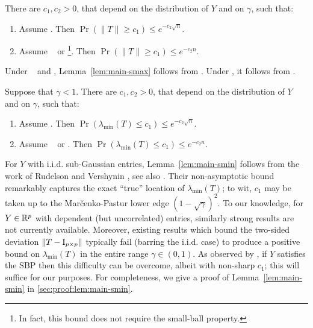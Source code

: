 \documentclass[times,sort&compress,3p]{elsarticle}
\begin{document}
\begin{lemma}\label{lem:main-smax}
    There are $c_1,c_2>0$, that depend on the distribution of $Y$ and on $\gamma$, such that:
    \begin{enumerate}
    \item Assume \AssumLC. Then $\Pr\left( \|T\| \ge c_1 \right) \le e^{-c_2 \sqrt{n}}$.
    \item Assume \AssumIndep~ or \AssumCCPSB \footnote{In fact, this bound does not require the small-ball property.}. Then $\Pr\left( \|T\| \ge c_1 \right) \le e^{-c_2 n}$.
    \end{enumerate}
\end{lemma}
Under \AssumIndep~ and \AssumCCPSB, Lemma~\ref{lem:main-smax} follows from \cite[Theorem 5.39]{Vershynin}. Under \AssumLC, it follows from \cite[Theorem 1]{adamczak2011sharp}. 

\begin{lemma}\label{lem:main-smin}
    Suppose that $\gamma < 1$. There are $c_1,c_2>0$, that depend on the distribution of $Y$ and on $\gamma$, such that:
    \begin{enumerate}
        \item Assume \AssumLC. Then $\Pr\left( \lambda_{\min}(T) \le c_1 \right) \le e^{-c_2 \sqrt{n}}$.
        \item Assume \AssumIndep~ or \AssumCCPSB. Then $\Pr\left( \lambda_{\min}(T) \le c_1 \right) \le e^{-c_2 n}$.
    \end{enumerate}
\end{lemma}
For $Y$ with i.i.d. sub-Gaussian entries, Lemma~\ref{lem:main-smin} follows from the work of Rudelson and Vershynin \cite{rudelson2009smallest}, see also 
\cite[Theorem 5.38]{Vershynin}. Their non-asymptotic bound remarkably captures the exact ``true'' location of $\lambda_{\min}(T)$; to wit, $c_1$ may be taken up to the Mar\v{c}enko-Pastur lower edge $(1-\sqrt{\gamma})^2$. To our knowledge, for $Y\in \mathbb{R}^p$ with dependent (but uncorrelated) entries, similarly strong results are not currently available. Moreover, existing results which bound the two-sided deviation $\|T-\mathrm{I}_{p \times p}\|$ typically fail (barring the i.i.d. case) to produce a positive bound on $\lambda_{\min}(T)$ in the entire range $\gamma\in (0,1)$. As observed by \cite{koltchinskii2015bounding}, if $Y$ satisfies the SBP then this difficulty can be overcome, albeit with non-sharp $c_1$; this will suffice for our purposes. 
For completeness, we give a proof of Lemma~\ref{lem:main-smin} in 
\ref{sec:proof:lem:main-smin}.
\end{document}
